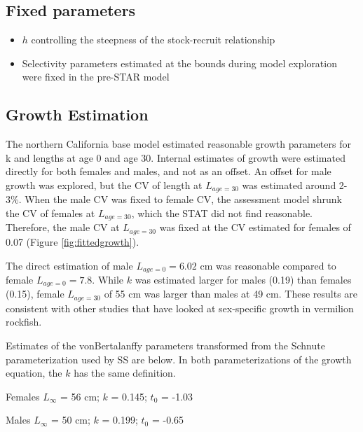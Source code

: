 \documentclass[
  english,
  a4paper,
]{article}
\providecommand{\tightlist}{%
  \setlength{\itemsep}{0pt}\setlength{\parskip}{0pt}}
\begin{document}
\hypertarget{fixed-parameters}{%
\subsection{Fixed parameters}\label{fixed-parameters}}

\begin{itemize}
\tightlist
\item
  \(h\) controlling the steepness of the stock-recruit relationship
\item
  Selectivity parameters estimated at the bounds during model exploration were fixed in the pre-STAR model
\end{itemize}

\hypertarget{growth-estimation}{%
\subsection{Growth Estimation}\label{growth-estimation}}

The northern California base model estimated reasonable growth parameters for k and lengths at age 0 and age 30. Internal estimates of growth were estimated directly for both females and males, and not as an offset. An offset for male growth was explored, but the CV of length at \(L_{age=30}\) was estimated around 2-3\%. When the male CV was fixed to female CV, the assessment model shrunk the CV of females at \(L_{age=30}\), which the STAT did not find reasonable. Therefore, the male CV at \(L_{age=30}\) was fixed at the CV estimated for females of 0.07 (Figure \ref{fig:fittedgrowth}).

The direct estimation of male \(L_{age=0}=6.02\) cm was reasonable compared to female \(L_{age=0}=7.8\). While \(k\) was estimated larger for males (0.19) than females (0.15), female \(L_{age=30}\) of 55 cm was larger than males at 49 cm. These results are consistent with other studies that have looked at sex-specific growth in vermilion rockfish.

Estimates of the vonBertalanffy parameters transformed from the Schnute parameterization used by SS are below. In both parameterizations of the growth equation, the \(k\) has the same definition.

\begin{centering}

Females $L_{\infty}$ = 56 cm; $k$ = 0.145; $t_0$ = -1.03

Males $L_{\infty}$ = 50 cm; $k$ = 0.199; $t_0$ = -0.65

\end{centering}
\end{document}
